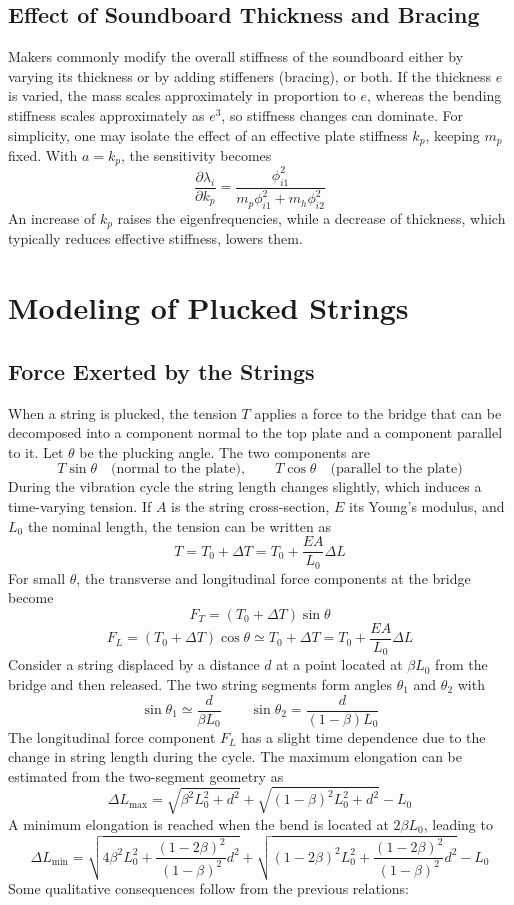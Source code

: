 \subsection{Effect of Soundboard Thickness and Bracing}

Makers commonly modify the overall stiffness of the soundboard either by varying its thickness or by adding stiffeners (bracing), or both. If the thickness \( e \) is varied, the mass scales approximately in proportion to \( e \), whereas the bending stiffness scales approximately as \( e^{3} \), so stiffness changes can dominate. For simplicity, one may isolate the effect of an effective plate stiffness \( k_p \), keeping \( m_p \) fixed. With \( a=k_p \), the sensitivity becomes
\[
\frac{\partial \lambda_i}{\partial k_p}
=
\frac{\phi_{i1}^{2}}{m_p\phi_{i1}^{2}+m_h\phi_{i2}^{2}}
\]
An increase of \( k_p \) raises the eigenfrequencies, while a decrease of thickness, which typically reduces effective stiffness, lowers them.

\section{Modeling of Plucked Strings}

\subsection{Force Exerted by the Strings}

When a string is plucked, the tension \( T \) applies a force to the bridge that can be decomposed into a component normal to the top plate and a component parallel to it. Let \( \theta \) be the plucking angle. The two components are
\[
T\sin\theta \quad \text{(normal to the plate)}, \qquad T\cos\theta \quad \text{(parallel to the plate)}
\]
During the vibration cycle the string length changes slightly, which induces a time-varying tension. If \( A \) is the string cross-section, \( E \) its Young's modulus, and \( L_0 \) the nominal length, the tension can be written as
\[
T = T_0 + \Delta T = T_0 + \frac{EA}{L_0}\Delta L
\]
For small \( \theta \), the transverse and longitudinal force components at the bridge become
\[
F_T = (T_0+\Delta T)\sin\theta
\]
\[
F_L = (T_0+\Delta T)\cos\theta \simeq T_0+\Delta T = T_0 + \frac{EA}{L_0}\Delta L
\]
Consider a string displaced by a distance \( d \) at a point located at \( \beta L_0 \) from the bridge and then released. The two string segments form angles \( \theta_1 \) and \( \theta_2 \) with
\[
\sin\theta_1 \simeq \frac{d}{\beta L_0}
\qquad
\sin\theta_2 = \frac{d}{(1-\beta)L_0}
\]
The longitudinal force component \( F_L \) has a slight time dependence due to the change in string length during the cycle. The maximum elongation can be estimated from the two-segment geometry as
\[
\Delta L_{\max}
=
\sqrt{\beta^{2}L_{0}^{2}+d^{2}}
+
\sqrt{(1-\beta)^{2}L_{0}^{2}+d^{2}}
-
L_{0}
\]
A minimum elongation is reached when the bend is located at \( 2\beta L_0 \), leading to
\[
\Delta L_{\min}
=
\sqrt{4\beta^{2}L_{0}^{2}+\frac{(1-2\beta)^{2}}{(1-\beta)^{2}}d^{2}}
+
\sqrt{(1-2\beta)^{2}L_{0}^{2}+\frac{(1-2\beta)^{2}}{(1-\beta)^{2}}d^{2}}
-
L_{0}
\]
Some qualitative consequences follow from the previous relations:

